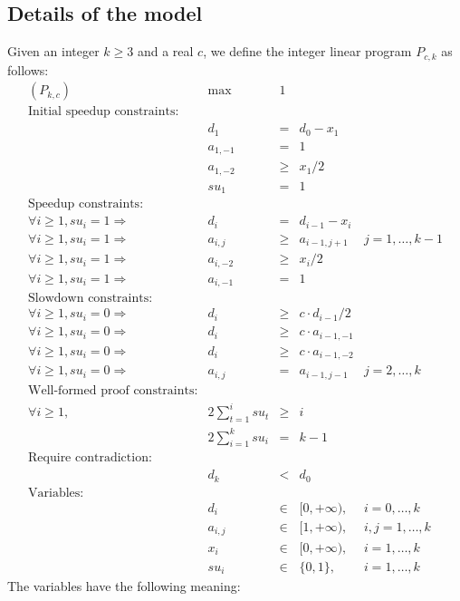 \documentclass[a4paper, 11pt]{article}
\theoremstyle{plain}
\theoremstyle{definition}
\theoremstyle{remark}
\begin{document}
\subsection{Details of the model}
Given an integer $k \ge 3$ and a real $c$, we define the integer linear program $P_{c,k}$ as follows:
\[
\begin{array}{rrcll}
	(P_{k,c}) &\max& 1&&\\
	\text{Initial speedup constraints:}&&&&\\
	&d_1&=&d_0 - x_1&\\
	&a_{1, -1}&=&1&\\
	&a_{1, -2}&\ge&x_1/2&\\
	&su_1&=&1&\\
	\text{Speedup constraints:}&&&&\\
	\forall i \ge 1, su_i = 1\Rightarrow &d_i&=&d_{i-1} - x_i&\\
	\forall i \ge 1, su_i = 1\Rightarrow &a_{i, j}&\ge&a_{i-1, j+1}& j = 1,\ldots,k-1\\
	\forall i \ge 1, su_i = 1\Rightarrow &a_{i, -2}&\ge&x_i/2&\\
	\forall i \ge 1, su_i = 1\Rightarrow &a_{i, -1}&=&1&\\
	\text{Slowdown constraints:}&&&&\\
	\forall i \ge 1, su_i = 0\Rightarrow &d_i&\ge&c\cdot d_{i-1}/2&\\
	\forall i \ge 1, su_i = 0\Rightarrow &d_i&\ge&c\cdot a_{i-1, -1}&\\
	\forall i \ge 1, su_i = 0\Rightarrow &d_i&\ge&c\cdot a_{i-1, -2}&\\
	\forall i \ge 1, su_i = 0\Rightarrow &a_{i, j}&=&a_{i-1, j-1}& j = 2,\ldots,k\\
	\text{Well-formed proof constraints:}&&&&\\
	\forall i \ge 1, & 2\sum_{t=1}^i su_{t} &\ge& i&\\ 
					 & 2\sum_{i=1}^k su_{i} &=& k - 1&\\ 
	\text{Require contradiction:}&&&&\\
	& d_k &<&d_0&\\
	\text{Variables:}&&&&\\
	&d_i &\in& [0,+\infty), &i =0,\ldots, k\\
	&a_{i,j} &\in& [1,+\infty), &i,j =1,\ldots, k\\
	&x_i &\in& [0,+\infty), &i =1,\ldots, k\\
	&su_{i} &\in& \{0,1\}, &i =1,\ldots, k
\end{array}
\]
The variables have the following meaning:
\end{document}
